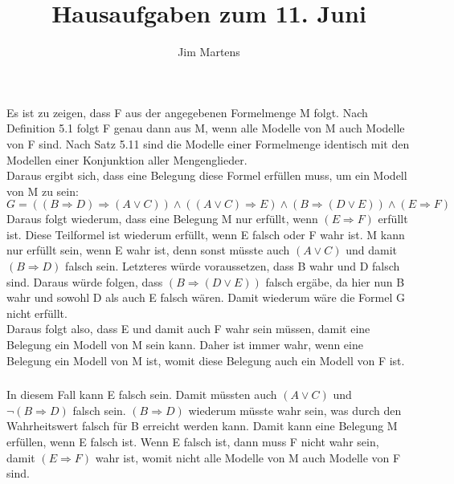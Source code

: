 \documentclass[10pt,a4paper,oneside,ngerman,numbers=noenddot]{scrartcl}
\begin{document}
\author{Jim Martens}
\title{Hausaufgaben zum 11. Juni}
\maketitle

\section{} %
\subsection{} %
\subsubsection{} %
Es ist zu zeigen, dass F aus der angegebenen Formelmenge M folgt. Nach Definition 5.1 folgt F genau dann aus M, wenn alle Modelle von M auch Modelle von F sind. Nach Satz 5.11 sind die Modelle einer Formelmenge identisch mit den Modellen einer Konjunktion aller Mengenglieder.\\
Daraus ergibt sich, dass eine Belegung diese Formel erfüllen muss, um ein Modell von M zu sein:\\
$G = ((B \Rightarrow D) \Rightarrow (A \vee C)) \wedge ((A \vee C) \Rightarrow E) \wedge (B \Rightarrow (D \vee E)) \wedge (E \Rightarrow F)$\\
Daraus folgt wiederum, dass eine Belegung M nur erfüllt, wenn $(E \Rightarrow F)$ erfüllt ist. Diese Teilformel ist wiederum erfüllt, wenn E falsch oder F wahr ist. 
M kann nur erfüllt sein, wenn E wahr ist, denn sonst müsste auch $(A \vee C)$ und damit $(B \Rightarrow D)$ falsch sein. Letzteres würde voraussetzen, dass B wahr und D falsch sind. Daraus würde folgen, dass $(B \Rightarrow (D \vee E))$ falsch ergäbe, da hier nun B wahr und sowohl D als auch E falsch wären. Damit wiederum wäre die Formel G nicht erfüllt.\\
Daraus folgt also, dass E und damit auch F wahr sein müssen, damit eine Belegung ein Modell von M sein kann. Daher ist immer wahr, wenn eine Belegung ein Modell von M ist, womit diese Belegung auch ein Modell von F ist.
\subsubsection{} %
In diesem Fall kann E falsch sein. Damit müssten auch $(A \vee C)$ und $\neg(B \Rightarrow D)$ falsch sein. $(B \Rightarrow D)$ wiederum müsste wahr sein, was durch den Wahrheitswert falsch für B erreicht werden kann. Damit kann eine Belegung M erfüllen, wenn E falsch ist. Wenn E falsch ist, dann muss F nicht wahr sein, damit $(E \Rightarrow F)$ wahr ist, womit nicht alle Modelle von M auch Modelle von F sind.
\end{document}
